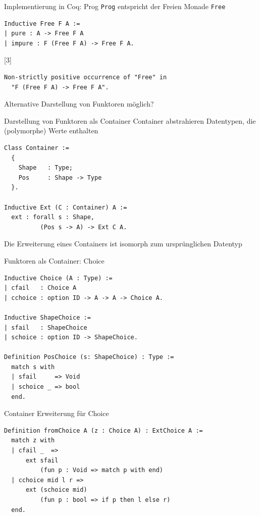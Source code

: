 \documentclass{beamer}
\begin{document}
\begin{frame}[fragile]{Implementierung in Coq: Prog}
\texttt{Prog} entspricht der Freien Monade \texttt{Free}
\begin{verbatim}
Inductive Free F A :=
| pure : A -> Free F A
| impure : F (Free F A) -> Free F A.
\end{verbatim}
\hspace{.39\linewidth}
\scalebox{3}[3]{\MVArrowDown}
\begin{verbatim}
Non-strictly positive occurrence of "Free" in
  "F (Free F A) -> Free F A".
\end{verbatim}
\vfill
\MVRightArrow{} Alternative Darstellung von Funktoren möglich?
\end{frame}

\begin{frame}[fragile]{Darstellung von Funktoren als Container}
\alert{Container} abstrahieren Datentypen, die (polymorphe) Werte enthalten
\begin{verbatim}
Class Container :=
  {
    Shape   : Type;
    Pos     : Shape -> Type
  }.

Inductive Ext (C : Container) A := 
  ext : forall s : Shape,
          (Pos s -> A) -> Ext C A.
\end{verbatim}

Die \alert{Erweiterung eines Containers} ist isomorph zum ursprünglichen Datentyp
\end{frame}

\begin{frame}[fragile]{Funktoren als Container: Choice}
\begin{verbatim}
Inductive Choice (A : Type) :=
| cfail   : Choice A
| cchoice : option ID -> A -> A -> Choice A.

Inductive ShapeChoice :=
| sfail   : ShapeChoice
| schoice : option ID -> ShapeChoice.

Definition PosChoice (s: ShapeChoice) : Type :=
  match s with
  | sfail     => Void
  | schoice _ => bool
  end.
\end{verbatim}
\end{frame}

\begin{frame}[fragile]{Container Erweiterung für Choice}
\begin{verbatim}
Definition fromChoice A (z : Choice A) : ExtChoice A :=
  match z with
  | cfail _  => 
      ext sfail 
          (fun p : Void => match p with end)
  | cchoice mid l r =>
      ext (schoice mid) 
          (fun p : bool => if p then l else r)
  end.
\end{verbatim}
\end{frame}
\end{document}
